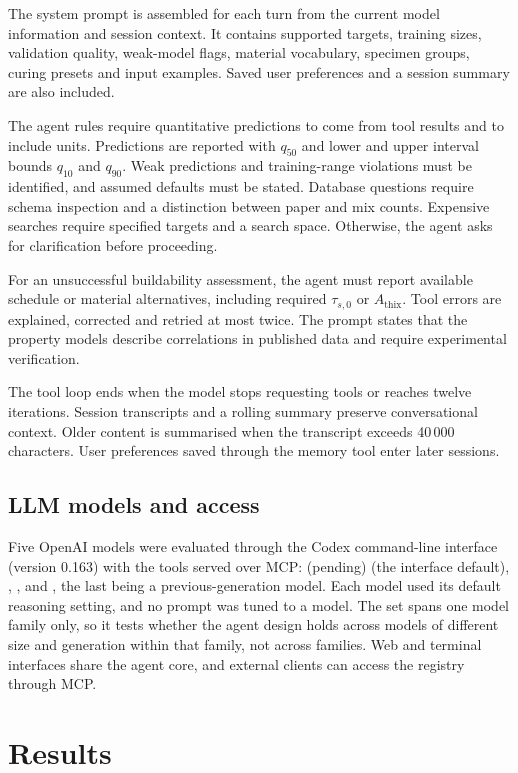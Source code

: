 \documentclass[preprint,12pt]{elsarticle}
\providecommand{\nbenchCxModel}{(pending)}
\begin{document}
The system prompt is assembled for each turn from the current model information and session context. It contains supported targets, training sizes, validation quality, weak-model flags, material vocabulary, specimen groups, curing presets and input examples. Saved user preferences and a session summary are also included.

The agent rules require quantitative predictions to come from tool results and to include units. Predictions are reported with $q_{50}$ and lower and upper interval bounds $q_{10}$ and $q_{90}$. Weak predictions and training-range violations must be identified, and assumed defaults must be stated. Database questions require schema inspection and a distinction between paper and mix counts. Expensive searches require specified targets and a search space. Otherwise, the agent asks for clarification before proceeding.

For an unsuccessful buildability assessment, the agent must report available schedule or material alternatives, including required $\tau_{s,0}$ or $A_{\mathrm{thix}}$. Tool errors are explained, corrected and retried at most twice. The prompt states that the property models describe correlations in published data and require experimental verification.

The tool loop ends when the model stops requesting tools or reaches twelve iterations. Session transcripts and a rolling summary preserve conversational context. Older content is summarised when the transcript exceeds 40\,000 characters. User preferences saved through the memory tool enter later sessions.

\subsection{LLM models and access}

Five OpenAI models were evaluated through the Codex command-line interface (version 0.163) with the tools served over MCP: \nbenchCxModel{} (the interface default), \nbenchCsModel{}, \nbenchCuModel{}, \nbenchCvModel{} and \nbenchCwModel{}, the last being a previous-generation model. Each model used its default reasoning setting, and no prompt was tuned to a model. The set spans one model family only, so it tests whether the agent design holds across models of different size and generation within that family, not across families. Web and terminal interfaces share the agent core, and external clients can access the registry through MCP.

\section{Results}\label{sec:results}
\end{document}
